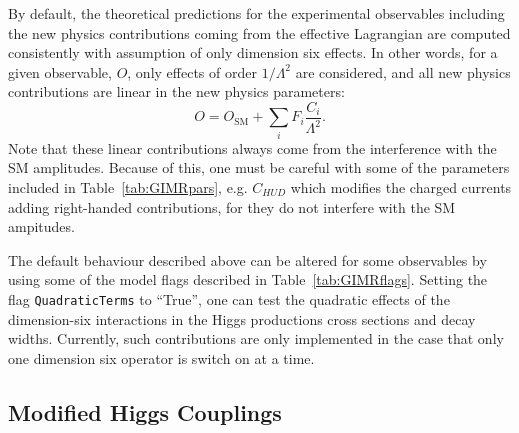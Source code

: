 \documentclass[preprint,3p,12pt]{elsarticle}
\begin{document}
{By default, the theoretical predictions for the experimental observables including the new physics contributions coming from the effective Lagrangian are computed consistently with assumption of only dimension six effects. In other words, for a given observable, $O$, only effects of order $1/\Lambda^2$ are considered, and all new physics contributions are linear in the new physics parameters:
%
\begin{equation}
O=O_{\mathrm{SM}}+ \sum_i F_i \frac{C_i}{\Lambda^2}.
\label{eq:Odim6}
\end{equation}
%
Note that these linear contributions always come from the interference with the SM amplitudes. Because of this, one must be careful with some of the parameters included in Table~\ref{tab:GIMRpars}, e.g. $C_{HUD}$ which modifies the charged currents adding right-handed contributions, for they do not interfere with the SM ampitudes. 

The default behaviour described above can be altered for some observables by using some of the model flags described in Table~\ref{tab:GIMRflags}. Setting the flag {\tt QuadraticTerms} to ``True'', one can test the quadratic effects of the dimension-six interactions in the Higgs productions cross sections and decay widths. Currently, such contributions are only implemented in the case that only one dimension six operator is switch on at a time. 

\subsection{Modified Higgs Couplings}
\label{sec:Higgs}

}
\end{document}
